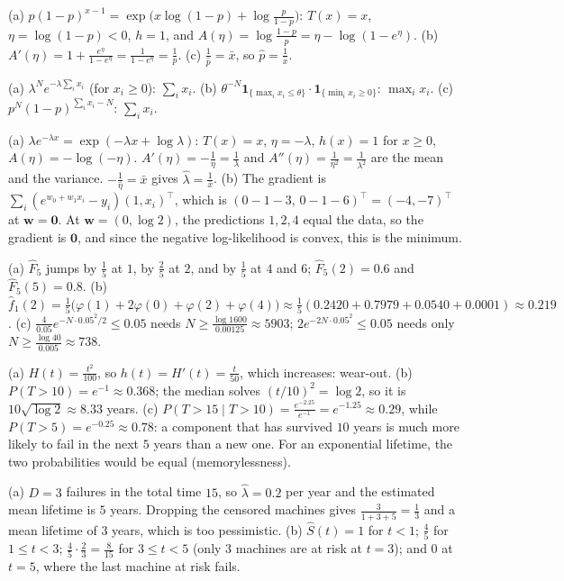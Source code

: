 \documentclass[11pt]{article}
\begin{document}
\begin{description}[leftmargin=0pt, itemsep=0.3em]
    \item[\ref{pr:expfam-practice}.] (a) $p(1 - p)^{x-1} = \exp\big(x\log(1 - p) + \log\frac{p}{1 - p}\big)$: $T(x) = x$, $\eta = \log(1 - p) < 0$, $h = 1$, and $A(\eta) = \log\frac{1 - p}{p} = \eta - \log(1 - e^\eta)$. (b) $A'(\eta) = 1 + \frac{e^\eta}{1 - e^\eta} = \frac{1}{1 - e^\eta} = \frac{1}{p}$. (c) $\frac{1}{\hat p} = \bar x$, so $\hat p = \frac{1}{\bar x}$.
    \item[\ref{pr:factorization-practice}.] (a) $\lambda^Ne^{-\lambda\sum_i x_i}$ (for $x_i \geq 0$): $\sum_i x_i$. (b) $\theta^{-N}\mathbf{1}_{\{\max_i x_i \leq \theta\}} \cdot \mathbf{1}_{\{\min_i x_i \geq 0\}}$: $\max_i x_i$. (c) $p^N(1 - p)^{\sum_i x_i - N}$: $\sum_i x_i$.
    \item[\ref{pr:exp-family}.] (a) $\lambda e^{-\lambda x} = \exp(-\lambda x + \log\lambda)$: $T(x) = x$, $\eta = -\lambda$, $h(x) = 1$ for $x \geq 0$, $A(\eta) = -\log(-\eta)$. $A'(\eta) = -\frac{1}{\eta} = \frac{1}{\lambda}$ and $A''(\eta) = \frac{1}{\eta^2} = \frac{1}{\lambda^2}$ are the mean and the variance. $-\frac{1}{\hat\eta} = \bar x$ gives $\hat\lambda = \frac{1}{\bar x}$. (b) The gradient is $\sum_i (e^{w_0 + w_1x_i} - y_i)(1, x_i)^\top$, which is $(0 - 1 - 3, \, 0 - 1 - 6)^\top = (-4, -7)^\top$ at $\mathbf{w} = \mathbf{0}$. At $\mathbf{w} = (0, \log 2)$, the predictions $1, 2, 4$ equal the data, so the gradient is $\mathbf{0}$, and since the negative log-likelihood is convex, this is the minimum.
\item[\ref{pr:ecdf-kde}.] (a) $\hat F_5$ jumps by $\frac{1}{5}$ at $1$, by $\frac{2}{5}$ at $2$, and by $\frac{1}{5}$ at $4$ and $6$; $\hat F_5(2) = 0.6$ and $\hat F_5(5) = 0.8$. (b) $\hat f_1(2) = \frac{1}{5}\big(\varphi(1) + 2\varphi(0) + \varphi(2) + \varphi(4)\big) \approx \frac{1}{5}(0.2420 + 0.7979 + 0.0540 + 0.0001) \approx 0.219$. (c) $\frac{4}{0.05}e^{-N \cdot 0.05^2/2} \leq 0.05$ needs $N \geq \frac{\log 1600}{0.00125} \approx 5903$; $2e^{-2N \cdot 0.05^2} \leq 0.05$ needs only $N \geq \frac{\log 40}{0.005} \approx 738$.
    \item[\ref{pr:hazard-practice}.] (a) $H(t) = \frac{t^2}{100}$, so $h(t) = H'(t) = \frac{t}{50}$, which increases: wear-out. (b) $P(T > 10) = e^{-1} \approx 0.368$; the median solves $(t/10)^2 = \log 2$, so it is $10\sqrt{\log 2} \approx 8.33$ years. (c) $P(T > 15 \mid T > 10) = \frac{e^{-2.25}}{e^{-1}} = e^{-1.25} \approx 0.29$, while $P(T > 5) = e^{-0.25} \approx 0.78$: a component that has survived $10$ years is much more likely to fail in the next $5$ years than a new one. For an exponential lifetime, the two probabilities would be equal (memorylessness).
    \item[\ref{pr:censored-practice}.] (a) $D = 3$ failures in the total time $15$, so $\hat\lambda = 0.2$ per year and the estimated mean lifetime is $5$ years. Dropping the censored machines gives $\frac{3}{1 + 3 + 5} = \frac{1}{3}$ and a mean lifetime of $3$ years, which is too pessimistic. (b) $\hat S(t) = 1$ for $t < 1$; $\frac{4}{5}$ for $1 \leq t < 3$; $\frac{4}{5} \cdot \frac{2}{3} = \frac{8}{15}$ for $3 \leq t < 5$ (only $3$ machines are at risk at $t = 3$); and $0$ at $t = 5$, where the last machine at risk fails.
\end{description}
\end{document}

